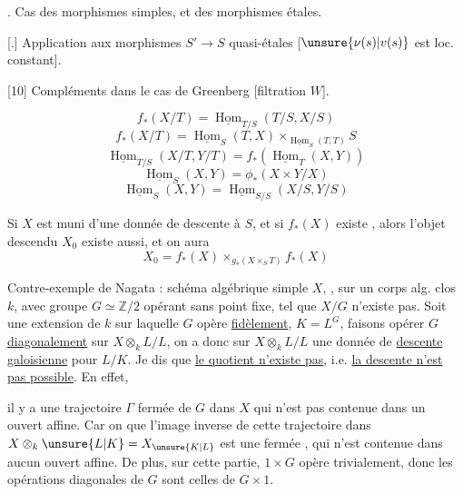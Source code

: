 . Cas des morphismes simples, et des morphismes étales. 

[.] Application aux morphismes $S'\to S$ quasi-étales [$\unsure{\nu(s)|v(s)}$ est loc. constant]. 

[10] Compléments dans le cas de Greenberg [filtration  $W$].

\[
f_*(X/T)=\underline{\operatorname{Hom}}_{T/S}(T/S,X/S)
\]
\[
f_*(X/T)=\underline{\operatorname{Hom}}_S(T,X)\times_{\underline{\operatorname{Hom}}_S(T,T)}S
\]
\[
\underline{\operatorname{Hom}}_{T/S}(X/T,Y/T)=f_*(\underline{\operatorname{Hom}}_T(X,Y))
\]
\[
\underline{\operatorname{Hom}}_S(X,Y)=\phi_*(X\times Y/X)
\]
\[
\underline{\operatorname{Hom}}_S(X,Y)=\underline{\operatorname{Hom}}_{S/S}(X/S,Y/S)
\]

Si $X$ est muni d'une donnée de descente à $S$, et si $f_*(X)$ existe , alors l'objet descendu $X_0$ existe aussi, et on aura
\[
X_0=f_*(X)\times_{g_*(X\times_S T)}f_*(X)
\]

Contre-exemple de Nagata : schéma algébrique simple $X$, , sur un corps alg. clos $k$, avec groupe $G\simeq\mathbb Z/2$ opérant sans point fixe, tel que $X/G$ n'existe pas. Soit  une extension de $k$ sur laquelle $G$ opère \uline{fidèlement},  $K=L^G$, faisons opérer $G$ \uline{diagonalement} sur $X\otimes_k L/L$, on a donc sur $X\otimes_k L/L$ une donnée de \uline{descente galoisienne} pour $L/K$. Je dis que \uline{le quotient n'existe pas}, i.e. \uline{la descente n'est pas possible}. En effet, 

il y a  une trajectoire $\Gamma$ fermée de $G$ dans $X$ qui n'est pas contenue dans un ouvert affine. Car on \uline{} que l'image inverse de cette trajectoire dans $X\otimes_k\unsure{L|K}=X_{\unsure{K|L}}$ est  une   fermée , qui n'est contenue dans aucun ouvert affine.  De plus, sur cette partie, $1\times G$ opère trivialement, donc les opérations  diagonales de $G$ sont celles de $G\times1$.

